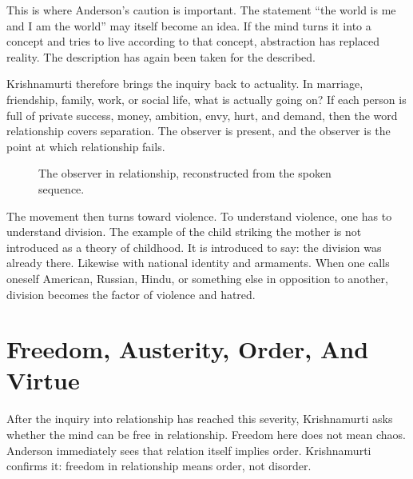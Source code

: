 This is where Anderson's caution is important. The statement ``the world is me and I am the world'' may itself become an idea. If the mind turns it into a concept and tries to live according to that concept, abstraction has replaced reality. The description has again been taken for the described.

Krishnamurti therefore brings the inquiry back to actuality. In marriage, friendship, family, work, or social life, what is actually going on? If each person is full of private success, money, ambition, envy, hurt, and demand, then the word relationship covers separation. The observer is present, and the observer is the point at which relationship fails.

\begin{figure}
\centering
{}
\caption{The observer in relationship, reconstructed from the spoken sequence.}
\end{figure}

The movement then turns toward violence. To understand violence, one has to understand division. The example of the child striking the mother is not introduced as a theory of childhood. It is introduced to say: the division was already there. Likewise with national identity and armaments. When one calls oneself American, Russian, Hindu, or something else in opposition to another, division becomes the factor of violence and hatred.

\section{Freedom, Austerity, Order, And Virtue}

After the inquiry into relationship has reached this severity, Krishnamurti asks whether the mind can be free in relationship. Freedom here does not mean chaos. Anderson immediately sees that relation itself implies order. Krishnamurti confirms it: freedom in relationship means order, not disorder.

